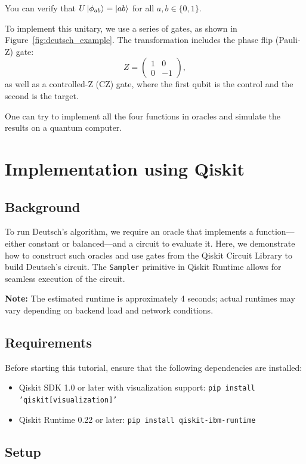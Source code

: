 \begin{example}
You can verify that $U\ket{\phi_{ab}} = \ket{ab}$ for all $a, b \in \{0, 1\}$.

To implement this unitary, we use a series of gates, as shown in Figure~\ref{fig:deutsch_example}. The transformation includes the phase flip (Pauli-Z) gate:
\[
Z = \begin{pmatrix}
1 & 0 \\
0 & -1
\end{pmatrix},
\]
as well as a controlled-Z (CZ) gate, where the first qubit is the control and the second is the target.
\end{example}

One can try to implement all the four functions in oracles and simulate the results on a quantum computer.

\section{Implementation using Qiskit}
\subsection{Background}

To run Deutsch's algorithm, we require an oracle that implements a function—either constant or balanced—and a circuit to evaluate it. Here, we demonstrate how to construct such oracles and use gates from the Qiskit Circuit Library to build Deutsch's circuit. The \texttt{Sampler} primitive in Qiskit Runtime allows for seamless execution of the circuit.

\vspace{0.5em}
\noindent\textbf{Note:} The estimated runtime is approximately 4 seconds; actual runtimes may vary depending on backend load and network conditions.

\subsection{Requirements}

Before starting this tutorial, ensure that the following dependencies are installed:
\begin{itemize}
    \item Qiskit SDK 1.0 or later with visualization support: \texttt{pip install 'qiskit[visualization]'}
    \item Qiskit Runtime 0.22 or later: \texttt{pip install qiskit-ibm-runtime}
\end{itemize}

\subsection{Setup}

